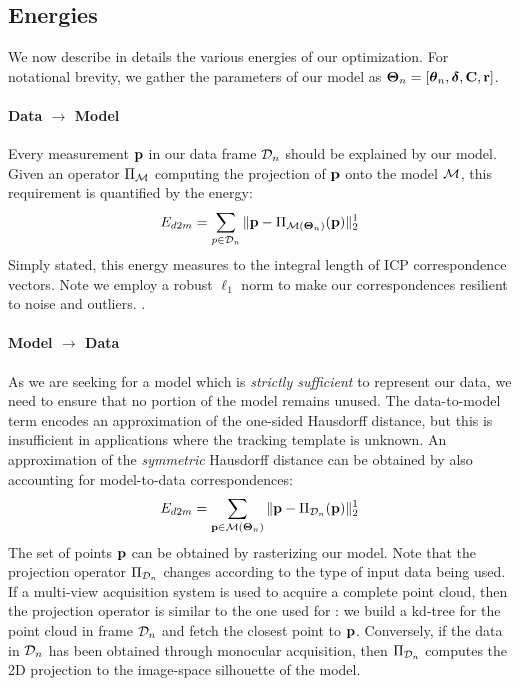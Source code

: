 \subsection{Energies}
We now describe in details the various energies of our optimization. For notational brevity, we gather the parameters of our model as $\boldsymbol{\Theta}_n=[\boldsymbol{\theta}_n, \boldsymbol{\delta}, \mathbf{C}, \mathbf{r}]$.

\paragraph{Data $\rightarrow$ Model}
Every measurement $\mathbf{p}$ in our data frame $\mathcal{D}_n$ should be explained by our model. Given an operator $\Pi_{\mathcal{M}}$ computing the projection of $\mathbf{p}$ onto the model $\mathcal{M}$, this requirement is quantified by the energy:
% 
\begin{equation}
E_{d2m} = \sum_{p \in \mathcal{D}_n} \| \mathbf{p} - \Pi_{\mathcal{M}(\boldsymbol{\Theta}_n)}(\mathbf{p})\|_2^1
\label{eq:d2m}
\end{equation}
% 
Simply stated, this energy measures to the integral length of ICP correspondence vectors. Note we employ a robust $\ell_1$ norm to make our correspondences resilient to noise and outliers. .



\paragraph{Model $\rightarrow$ Data}
As we are seeking for a model which is \emph{strictly sufficient} to represent our data, we need to ensure that no portion of the model remains unused. The data-to-model term encodes an approximation of the one-sided Hausdorff distance, but this is insufficient in applications where the tracking template is unknown. An approximation of the \emph{symmetric} Hausdorff distance can be obtained by also accounting for model-to-data correspondences:
\begin{equation}
E_{d2m} = \sum_{\mathbf{p} \in \mathcal{M}(\boldsymbol{\Theta}_n)} \| \mathbf{p} - \Pi_{\mathcal{D}_n}(\mathbf{p})\|_2^1
\label{eq:m2d}
\end{equation}
The set of points $\mathbf{p}$ can be obtained by rasterizing our model. Note that the projection operator $\Pi_{\mathcal{D}_n}$ changes according to the type of input data being used. If a multi-view acquisition system is used to acquire a complete point cloud, then the projection operator is similar to the one used for : we build a kd-tree for the point cloud in frame $\mathcal{D}_n$ and fetch the closest point to $\mathbf{p}$. Conversely, if the data in $\mathcal{D}_n$ has been obtained through monocular acquisition, then $\Pi_{\mathcal{D}_n}$ computes the 2D projection to the image-space silhouette of the model.



